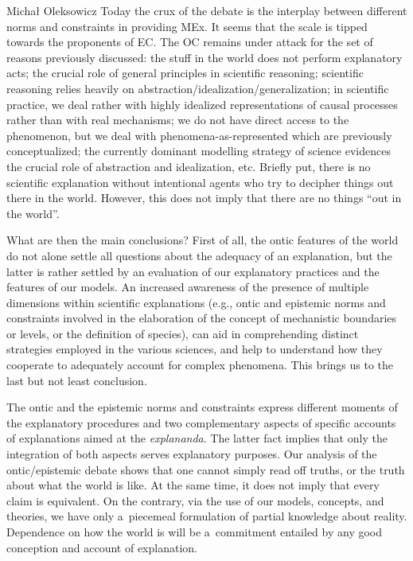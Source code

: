 \begin{artengenv}{Michał Oleksowicz}
Today the crux of the debate is the interplay between different norms and constraints in providing MEx. It seems that the scale is tipped towards the proponents of EC. The OC remains under attack for the set of reasons previously discussed: the stuff in the world does not perform explanatory acts; the crucial role of general principles in scientific reasoning; scientific reasoning relies heavily on abstraction/idealization/generalization; in scientific practice, we deal rather with highly idealized representations of causal processes rather than with real mechanisms; we do not have direct access to the phenomenon, but we deal with phenomena-as-represented which are previously conceptualized; the currently dominant modelling strategy of science evidences the crucial role of abstraction and idealization, etc. Briefly put, there is no scientific explanation without intentional agents who try to decipher things out there in the world. However, this does not imply that there are no things ``out in the world''.

What are then the main conclusions? First of all, the ontic features of the world do not alone settle all questions about the adequacy of an explanation, but the latter is rather settled by an evaluation of our explanatory practices and the features of our models. An increased awareness of the presence of multiple dimensions within scientific explanations (e.g., ontic and epistemic norms and constraints involved in the elaboration of the concept of mechanistic boundaries or levels, or the definition of species), can aid in comprehending distinct strategies employed in the various sciences, and help to understand how they cooperate to adequately account for complex phenomena. This brings us to the last but not least conclusion.

The ontic and the epistemic norms and constraints express different moments of the explanatory procedures and two complementary aspects of specific accounts of explanations aimed at the \textit{explananda}. The latter fact implies that only the integration of both aspects serves explanatory purposes. Our analysis of the ontic/epistemic debate shows that one cannot simply read off truths, or the truth about what the world is like. At the same time, it does not imply that every claim is equivalent. On the contrary, via the use of our models, concepts, and theories, we have only a~piecemeal formulation of partial knowledge about reality. Dependence on how the world is will be a~commitment entailed by any good conception and account of explanation.

\end{artengenv}

